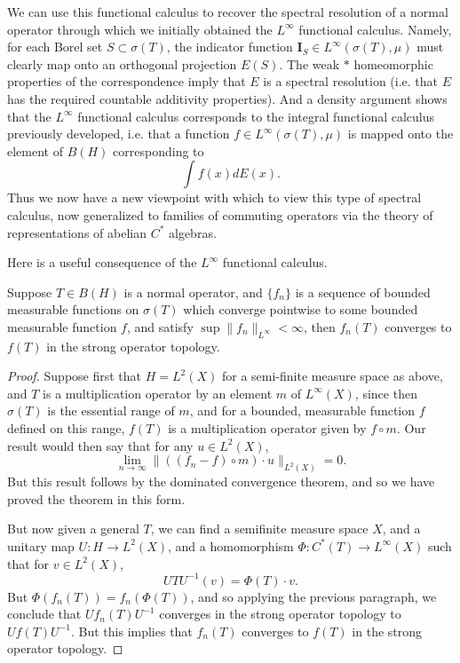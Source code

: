 We can use this functional calculus to recover the spectral resolution of a normal operator through which we initially obtained the $L^\infty$ functional calculus. Namely, for each Borel set $S \subset \sigma(T)$, the indicator function $\mathbf{I}_S \in L^\infty(\sigma(T),\mu)$ must clearly map onto an orthogonal projection $E(S)$. The weak $*$ homeomorphic properties of the correspondence imply that $E$ is a spectral resolution (i.e. that $E$ has the required countable additivity properties). And a density argument shows that the $L^\infty$ functional calculus corresponds to the integral functional calculus previously developed, i.e. that a function $f \in L^\infty(\sigma(T),\mu)$ is mapped onto the element of $B(H)$ corresponding to
%
\[ \int f(x) dE(x). \]
%
Thus we now have a new viewpoint with which to view this type of spectral calculus, now generalized to families of commuting operators via the theory of representations of abelian $C^*$ algebras.

Here is a useful consequence of the $L^\infty$ functional calculus.

\begin{theorem}
    Suppose $T \in B(H)$ is a normal operator, and $\{ f_n \}$ is a sequence of bounded measurable functions on $\sigma(T)$ which converge pointwise to some bounded measurable function $f$, and satisfy $\sup \| f_n \|_{L^\infty} < \infty$, then $f_n(T)$ converges to $f(T)$ in the strong operator topology.
\end{theorem}
\begin{proof}
    Suppose first that $H = L^2(X)$ for a semi-finite measure space as above, and $T$ is a multiplication operator by an element $m$ of $L^\infty(X)$, since then $\sigma(T)$ is the essential range of $m$, and for a bounded, measurable function $f$ defined on this range, $f(T)$ is a multiplication operator given by $f \circ m$. Our result would then say that for any $u \in L^2(X)$,
    \[ \lim_{n \to \infty} \| ((f_n - f) \circ m) \cdot u \|_{L^2(X)} = 0. \]
    But this result follows by the dominated convergence theorem, and so we have proved the theorem in this form.

    But now given a general $T$, we can find a semifinite measure space $X$, and a unitary map $U: H \to L^2(X)$, and a homomorphism $\Phi: C^*(T) \to L^\infty(X)$ such that for $v \in L^2(X)$,
    \[ UTU^{-1}(v) = \Phi(T) \cdot v. \]
    But $\Phi(f_n(T)) = f_n(\Phi(T))$, and so applying the previous paragraph, we conclude that $U f_n(T) U^{-1}$ converges in the strong operator topology to $U f(T) U^{-1}$. But this implies that $f_n(T)$ converges to $f(T)$ in the strong operator topology.
\end{proof}

